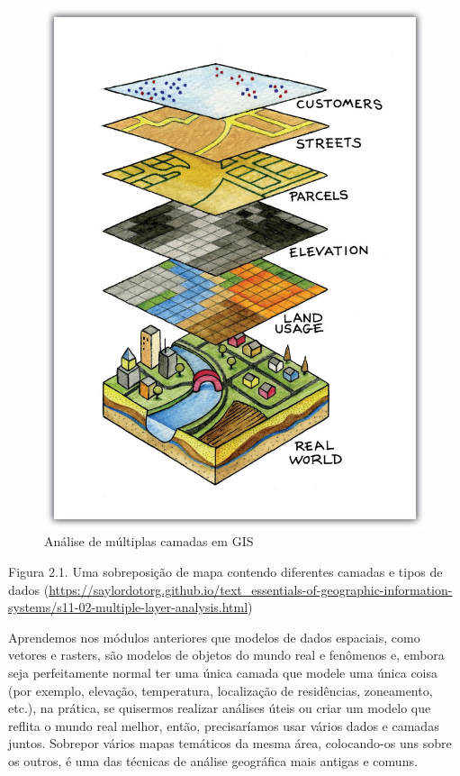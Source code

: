\documentclass[
]{book}
\begin{document}
\begin{figure}
\centering
\includegraphics{media/modulo2/spatial-layers.jpg}
\caption{Análise de múltiplas camadas em GIS}
\end{figure}

Figura 2.1. Uma sobreposição de mapa contendo diferentes camadas e tipos de dados (\href{https://saylordotorg.\%20github.io/text_essentials-of-geographic-information-systems/s11-02-multiple-layer-analysis.html}{https://saylordotorg.github.io/text\_essentials-of-geographic-information-systems/s11-02-multiple-layer-analysis.html})

Aprendemos nos módulos anteriores que modelos de dados espaciais, como vetores e rasters, são modelos de objetos do mundo real e fenômenos e, embora seja perfeitamente normal ter uma única camada que modele uma única coisa (por exemplo, elevação, temperatura, localização de residências, zoneamento, etc.), na prática, se quisermos realizar análises úteis ou criar um modelo que reflita o mundo real melhor, então, precisaríamos usar vários dados e camadas juntos. Sobrepor vários mapas temáticos da mesma área, colocando-os uns sobre os outros, é uma das técnicas de análise geográfica mais antigas e comuns.
\end{document}
